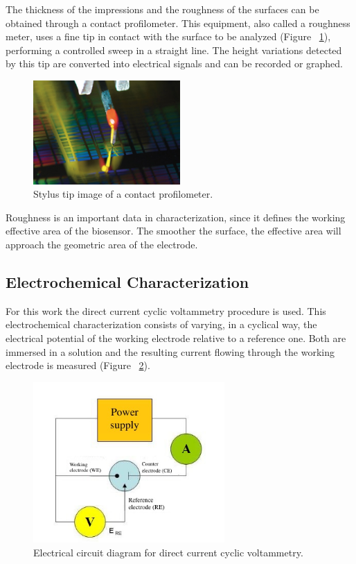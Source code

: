 The thickness of the impressions and the roughness of the surfaces can be obtained through a contact profilometer. This equipment, also called a roughness meter, uses a fine tip in contact with the surface to be analyzed (Figure ~\ref{fig:Figura_Stylus}), performing a controlled sweep in a straight line. The height variations detected by this tip are converted into electrical signals and can be recorded or graphed.

\begin{figure}[H]
  \centering
    \includegraphics[width=0.5\textwidth]{Figures/Figura_Stylus}
  \caption{Stylus tip image of a contact profilometer.}
  \label{fig:Figura_Stylus}
\end{figure}

Roughness is an important data in characterization, since it defines the working effective area of the biosensor. The smoother the surface, the effective area will approach the geometric area of the electrode.

\subsection{Electrochemical Characterization}
For this work the direct current cyclic voltammetry procedure is used. This electrochemical characterization consists of varying, in a cyclical way, the electrical potential of the working electrode relative to a reference one. Both are immersed in a solution and the resulting current flowing through the working electrode is measured (Figure ~\ref{fig:Figura_circuito_voltametria}). 

\begin{figure}[H]
  \centering
    \includegraphics[width=0.65\textwidth]{Figures/Figura_circuito_voltametria}
  \caption{Electrical circuit diagram for direct current cyclic voltammetry.}
  \label{fig:Figura_circuito_voltametria}
\end{figure}

